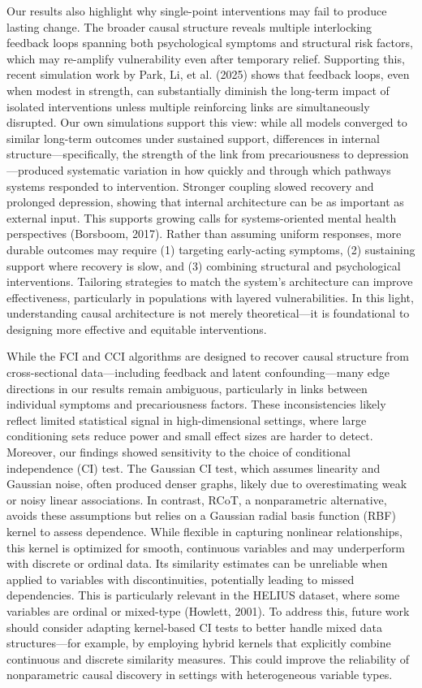 \documentclass[
]{article}
\begin{document}
Our results also highlight why single-point interventions may fail to
produce lasting change. The broader causal structure reveals multiple
interlocking feedback loops spanning both psychological symptoms and
structural risk factors, which may re-amplify vulnerability even after
temporary relief. Supporting this, recent simulation work by Park, Li,
et al. (2025) shows that feedback loops, even when modest in strength,
can substantially diminish the long-term impact of isolated
interventions unless multiple reinforcing links are simultaneously
disrupted. Our own simulations support this view: while all models
converged to similar long-term outcomes under sustained support,
differences in internal structure---specifically, the strength of the
link from precariousness to depression---produced systematic variation
in how quickly and through which pathways systems responded to
intervention. Stronger coupling slowed recovery and prolonged
depression, showing that internal architecture can be as important as
external input. This supports growing calls for systems-oriented mental
health perspectives (Borsboom, 2017). Rather than assuming uniform
responses, more durable outcomes may require (1) targeting early-acting
symptoms, (2) sustaining support where recovery is slow, and (3)
combining structural and psychological interventions. Tailoring
strategies to match the system's architecture can improve effectiveness,
particularly in populations with layered vulnerabilities. In this light,
understanding causal architecture is not merely theoretical---it is
foundational to designing more effective and equitable interventions.

While the FCI and CCI algorithms are designed to recover causal
structure from cross-sectional data---including feedback and latent
confounding---many edge directions in our results remain ambiguous,
particularly in links between individual symptoms and precariousness
factors. These inconsistencies likely reflect limited statistical signal
in high-dimensional settings, where large conditioning sets reduce power
and small effect sizes are harder to detect. Moreover, our findings
showed sensitivity to the choice of conditional independence (CI) test.
The Gaussian CI test, which assumes linearity and Gaussian noise, often
produced denser graphs, likely due to overestimating weak or noisy
linear associations. In contrast, RCoT, a nonparametric alternative,
avoids these assumptions but relies on a Gaussian radial basis function
(RBF) kernel to assess dependence. While flexible in capturing nonlinear
relationships, this kernel is optimized for smooth, continuous variables
and may underperform with discrete or ordinal data. Its similarity
estimates can be unreliable when applied to variables with
discontinuities, potentially leading to missed dependencies. This is
particularly relevant in the HELIUS dataset, where some variables are
ordinal or mixed-type (Howlett, 2001). To address this, future work
should consider adapting kernel-based CI tests to better handle mixed
data structures---for example, by employing hybrid kernels that
explicitly combine continuous and discrete similarity measures. This
could improve the reliability of nonparametric causal discovery in
settings with heterogeneous variable types.
\end{document}
